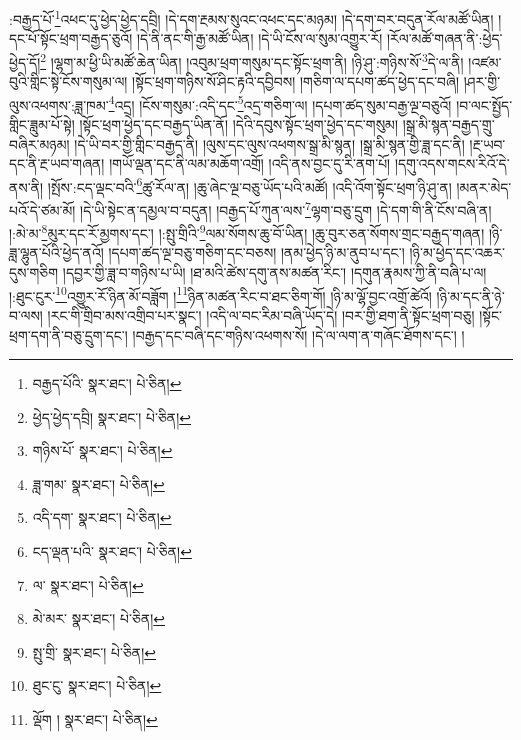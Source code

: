 :བརྒྱད་པོ་\footnote{བརྒྱད་པོའི་  སྣར་ཐང་།  པེ་ཅིན། }འཕང་དུ་ཕྱེད་ཕྱེད་དབྲི། །དེ་དག་རྔམས་སུའང་འཕང་དང་མཉམ། །དེ་དག་བར་བདུན་རོལ་མཚོ་ཡིན། །དང་པོ་སྟོང་ཕྲག་བརྒྱད་ཅུའོ། །དེ་ནི་ནང་གི་རྒྱ་མཚོ་ཡིན། །དེ་ཡི་ངོས་ལ་སུམ་འགྱུར་རོ། །རོལ་མཚོ་གཞན་ནི་:ཕྱེད་ཕྱེད་དོ།\footnote{ཕྱེད་ཕྱེད་དབྲི།  སྣར་ཐང་།  པེ་ཅིན། } །ལྷག་མ་ཕྱི་ཡི་མཚོ་ཆེན་ཡིན། །འབུམ་ཕྲག་གསུམ་དང་སྟོང་ཕྲག་ནི། །ཉི་ཤུ་:གཉིས་སོ་\footnote{གཉིས་པོ་  སྣར་ཐང་།  པེ་ཅིན། }དེ་ལ་ནི། །འཛམ་བུའི་གླིང་སྟེ་ངོས་གསུམ་ལ། །སྟོང་ཕྲག་གཉིས་སོ་ཤིང་རྟའི་དབྱིབས། །གཅིག་ལ་དཔག་ཚད་ཕྱེད་དང་བཞི། །ཤར་གྱི་ལུས་འཕགས་:ཟླ་ཁམ་\footnote{ཟླ་གམ་  སྣར་ཐང་།  པེ་ཅིན། }འདྲ། །ངོས་གསུམ་:འདི་དང་\footnote{འདི་དག་  སྣར་ཐང་།  པེ་ཅིན། }འདྲ་གཅིག་ལ། །དཔག་ཚད་སུམ་བརྒྱ་ལྔ་བཅུའོ། །བ་ལང་སྤྱོད་གླིང་ཟླུམ་པོ་སྟེ། །སྟོང་ཕྲག་ཕྱེད་དང་བརྒྱད་ཡིན་ནོ། །དེའི་དབུས་སྟོང་ཕྲག་ཕྱེད་དང་གསུམ། །སྒྲ་མི་སྙན་བརྒྱད་གྲུ་བཞིར་མཉམ། །དེ་ཡི་བར་གྱི་གླིང་བརྒྱད་ནི། །ལུས་དང་ལུས་འཕགས་སྒྲ་མི་སྙན། །སྒྲ་མི་སྙན་གྱི་ཟླ་དང་ནི། །རྔ་ཡབ་དང་ནི་རྔ་ཡབ་གཞན། །གཡོ་ལྡན་དང་ནི་ལམ་མཆོག་འགྲོ། །འདི་ནས་བྱང་དུ་རི་ནག་པོ། །དགུ་འདས་གངས་རིའོ་དེ་ནས་ནི། །སྤོས་:ངད་ལྡང་བའི་\footnote{ངད་ལྡན་པའི་  སྣར་ཐང་།  པེ་ཅིན། }ཚུ་རོལ་ན། །ཆུ་ཞེང་ལྔ་བཅུ་ཡོད་པའི་མཚོ། །འདི་འོག་སྟོང་ཕྲག་ཉི་ཤུ་ན། །མནར་མེད་པའོ་དེ་ཙམ་མོ། །དེ་ཡི་སྟེང་ན་དམྱལ་བ་བདུན། །བརྒྱད་པོ་ཀུན་ལས་\footnote{ལ་  སྣར་ཐང་།  པེ་ཅིན། }ལྷག་བཅུ་དྲུག །དེ་དག་གི་ནི་ངོས་བཞི་ན། །:མེ་མ་\footnote{མེ་མར་  སྣར་ཐང་།  པེ་ཅིན། }མུར་དང་རོ་མྱགས་དང་། །:སྤུ་གྲིའི་\footnote{སྤུ་གྲི་  སྣར་ཐང་།  པེ་ཅིན། }ལམ་སོགས་ཆུ་བོ་ཡིན། །ཆུ་བུར་ཅན་སོགས་གྲང་བརྒྱད་གཞན། །ཉི་ཟླ་ལྷུན་པོའི་ཕྱེད་ནའོ། །དཔག་ཚད་ལྔ་བཅུ་གཅིག་དང་བཅས། །ནམ་ཕྱེད་ཉི་མ་ནུབ་པ་དང་། །ཉི་མ་ཕྱེད་དང་འཆར་དུས་གཅིག །དབྱར་གྱི་ཟླ་བ་གཉིས་པ་ཡི། །ཐ་མའི་ཚེས་དགུ་ནས་མཚན་རིང་། །དགུན་རྣམས་ཀྱི་ནི་བཞི་པ་ལ། །:ཐུང་ངུར་\footnote{ཐུང་ངུ་  སྣར་ཐང་།  པེ་ཅིན། }འགྱུར་རོ་ཉིན་མོ་བཟློག །\footnote{ལྡོག །  སྣར་ཐང་།  པེ་ཅིན། }ཉིན་མཚན་རིང་བ་ཐང་ཅིག་གོ། །ཉི་མ་ལྷོ་བྱང་འགྲོ་ཚེའོ། །ཉི་མ་དང་ནི་ཉེ་བ་ལས། །རང་གི་གྲིབ་མས་འགྲིབ་པར་སྣང་། །འདི་ལ་བང་རིམ་བཞི་ཡོད་དེ། །བར་གྱི་ཐག་ནི་སྟོང་ཕྲག་བཅུ། །སྟོང་ཕྲག་དག་ནི་བཅུ་དྲུག་དང་། །བརྒྱད་དང་བཞི་དང་གཉིས་འཕགས་སོ། །དེ་ལ་ལག་ན་གཞོང་ཐོགས་དང་། །
